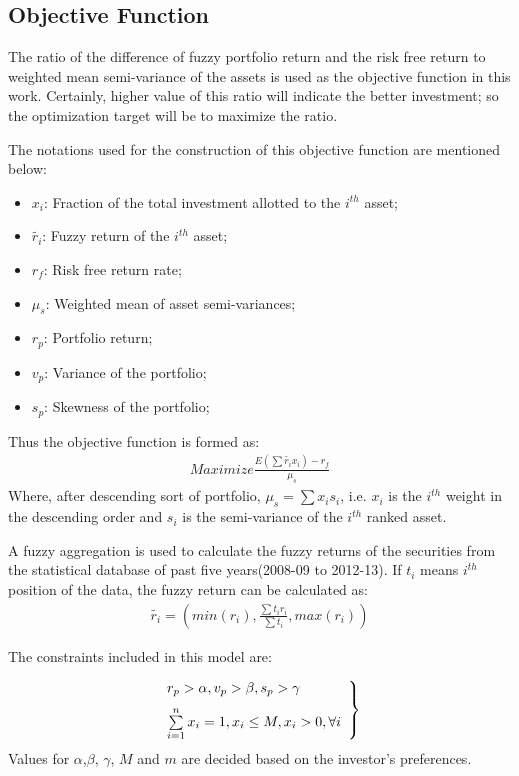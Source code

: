 \documentclass{ws-ijufks}
\begin{document}
\subsection{Objective Function}
The ratio of the difference of fuzzy portfolio return and the risk free return to weighted mean semi-variance of the 
assets is used as the objective function in this work. Certainly, higher value of this ratio will indicate the better 
investment; so the optimization target will be to maximize the ratio.

The notations used for the construction of this objective function are mentioned below:
\begin{itemize}
	\item $x_i$: Fraction of the total investment allotted to the $i^{th}$ asset;
	\item $\tilde{r_i}$: Fuzzy return of the $i^{th}$ asset;
	\item $r_f$: Risk free return rate;
	\item $\mu_s$: Weighted mean of asset semi-variances;
	\item $r_p$: Portfolio return;
	\item $v_p$: Variance of the portfolio;
	\item $s_p$: Skewness of the portfolio;
\end{itemize} 
Thus the objective function is formed as:
\begin{equation}
\begin{aligned}
Maximize \frac{E(\sum \tilde{r_i}x_i)-r_f}{\mu_s}
\end{aligned}
\end{equation} 
Where, after descending sort of portfolio, $\mu_s=\sum x_i s_i$, i.e. $x_i$ is the $i^{th}$ weight in the descending 
order and $s_i$ is the semi-variance of the $i^{th}$ ranked asset.

A fuzzy aggregation is used to calculate the fuzzy returns of the securities from the statistical database of past five 
years(2008-09 to 2012-13). If $t_i$ means $i^{th}$ position of the data, the fuzzy return can be calculated as:
\begin{equation}
\begin{aligned}
\tilde{r_i}=\left( { min(r_i),\frac{\sum t_i r_i}{\sum t_i},max(r_i)}\right) 
\end{aligned}
\end{equation}

The constraints included in this model are:

\begin{equation}
\begin{aligned}
\left. \begin{array}{ll}
\vspace{0.25cm}
r_p>\alpha, v_p>\beta, s_p>\gamma\\
\sum\limits_{i=1}^{n}x_i=1, x_i\leq M, x_i>0, \forall i
\end{array}\right\}
\end {aligned}
\end{equation}
Values for $\alpha$,$\beta$, $\gamma$, $M$ and $m$ are decided based on the investor's preferences. 
\end{document}
